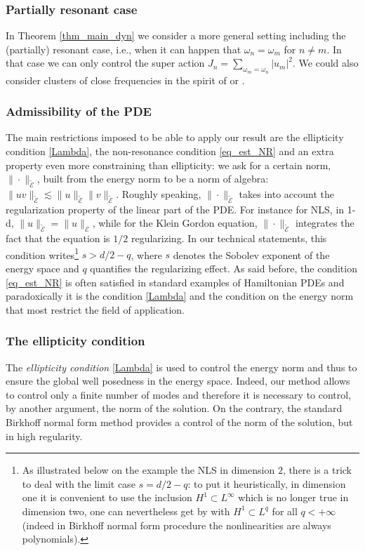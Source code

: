 \documentclass[11pt]{article}
\newcommand{\ie}{i.e.,\xspace}
\theoremstyle{definition}
\begin{document}
\subsubsection*{Partially resonant case}
In Theorem \ref{thm_main_dyn} we consider a more general setting including the (partially) resonant case, \ie when it can happen that $\omega_n=\omega_m$ for $n\neq m$. In that case we can only control the super action $J_n=\sum_{\omega_m=\omega_n}|u_m|^2$. We could also consider clusters of close frequencies in the spirit of \cite{BDGS07} or \cite{GIP}.

\subsubsection*{Admissibility of the PDE}
The main restrictions imposed to be able to apply our result are the ellipticity condition \eqref{Lambda}, the non-resonance condition \eqref{eq_est_NR} and an extra property even more constraining than ellipticity: we ask for a certain norm, $\|\cdot\|_{\tilde{\mathcal{E}}}$, built from the energy norm to be a norm of algebra:
$\|uv\|_{\tilde{\mathcal{E}}}\lesssim \|u\|_{\tilde{\mathcal{E}}} \|v\|_{\tilde{\mathcal{E}}}$. Roughly speaking, $\|\cdot\|_{\tilde{\mathcal{E}}}$ takes into account the regularization property of the linear part of the PDE. For instance for NLS, in 1-d, $\| u\|_{\tilde{\mathcal{E}}}=\|u\|_{{\mathcal{E}}}$, while for the Klein Gordon equation, $\|\cdot\|_{\tilde{\mathcal{E}}}$ integrates the fact that the equation is $1/2$ regularizing. In our technical statements, this condition writes\footnote{As illustrated below on the example the NLS in dimension $2$, there is a trick to deal with the limit case $s=d/2-q$: to put it heuristically, in dimension one it is convenient to use the inclusion $H^1\subset L^\infty$ which is no longer true in dimension two, one can nevertheless get by with $H^1\subset L^q$ for all $q<+\infty$ (indeed in Birkhoff normal form procedure the nonlinearities are always polynomials).} $s>d/2-q$, where $s$ denotes the Sobolev exponent of the energy space and $q$ quantifies the regularizing effect. As said before, the condition \eqref{eq_est_NR} is often satisfied in standard examples of Hamiltonian PDEs and paradoxically it is the condition \eqref{Lambda} and the condition on the energy norm that most restrict the field of application.

\subsubsection*{The ellipticity condition}
The {\it ellipticity condition} \eqref{Lambda} is used to control the energy norm and thus to ensure the global well posedness in the energy space. Indeed, our method allows to control only a finite number of modes and therefore it is necessary to control, by another argument, the norm of the solution. On the contrary, the standard Birkhoff normal form method provides a control of the norm of the solution, but in high regularity.
\end{document}

